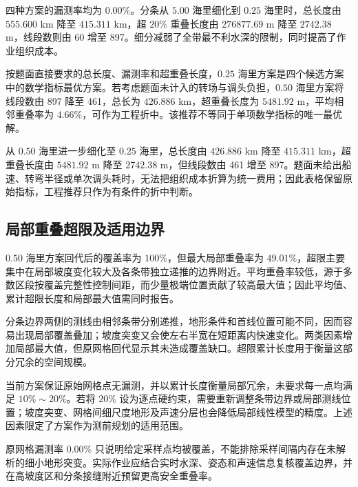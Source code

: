 四种方案的漏测率均为 $0.00\%$。分条从 $5.00$ 海里细化到 $0.25$ 海里时，总长度由 $555.600$ km 降至 $415.311$ km，超 $20\%$ 重叠长度由 $276877.69$ m 降至 $2742.38$ m，线段数则由 60 增至 897。细分减弱了全带最不利水深的限制，同时提高了作业组织成本。

按题面直接要求的总长度、漏测率和超重叠长度，$0.25$ 海里方案是四个候选方案中的数学指标最优方案。若考虑题面未计入的转场与调头负担，$0.50$ 海里方案将线段数由 897 降至 461，总长为 $426.886$ km，超重叠长度为 $5481.92$ m，平均相邻重叠率为 $4.66\%$，可作为工程折中。该推荐不等同于单项数学指标的唯一最优解。

从 $0.50$ 海里进一步细化至 $0.25$ 海里，总长度由 $426.886$ km 降至 $415.311$ km，超重叠长度由 $5481.92$ m 降至 $2742.38$ m，但线段数由 461 增至 897。题面未给出船速、转弯半径或单次调头耗时，无法把组织成本折算为统一费用；因此表格保留原始指标，工程推荐只作为有条件的折中判断。

\subsection{局部重叠超限及适用边界}

$0.50$ 海里方案回代后的覆盖率为 $100\%$，但最大局部重叠率为 $49.01\%$，超限主要集中在局部坡度变化较大及各条带独立递推的边界附近。平均重叠率较低，源于多数区段按覆盖完整性控制间距，而少量极端位置贡献了较高最大值；因此平均值、累计超限长度和局部最大值需同时报告。

分条边界两侧的测线由相邻条带分别递推，地形条件和首线位置可能不同，因而容易出现局部覆盖叠加；坡度突变又会使左右半宽在短距离内快速变化。两类因素增加局部最大值，但原网格回代显示其未造成覆盖缺口。超限累计长度用于衡量这部分冗余的空间规模。

当前方案保证原始网格点无漏测，并以累计长度衡量局部冗余，未要求每一点均满足 $10\%\sim20\%$。若将 $20\%$ 设为逐点硬约束，需要重新调整条带边界或局部测线位置；坡度突变、网格间细尺度地形及声速分层也会降低局部线性模型的精度。上述因素限定了方案作为测前规划的适用范围。

原网格漏测率 $0.00\%$ 只说明给定采样点均被覆盖，不能排除采样间隔内存在未解析的细小地形突变。实际作业应结合实时水深、姿态和声速信息复核覆盖边界，并在高坡度区和分条接缝附近预留更高安全重叠率。
